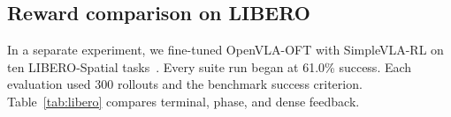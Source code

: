 \subsection{Reward comparison on LIBERO}\label{sec:libero_results}
In a separate experiment, we fine-tuned OpenVLA-OFT with SimpleVLA-RL on ten LIBERO-Spatial tasks~\cite{openvlaoft,simplevlarl,libero}. Every suite run began at 61.0\% success. Each evaluation used 300 rollouts and the benchmark success criterion. Table~\ref{tab:libero} compares terminal, phase, and dense feedback.


